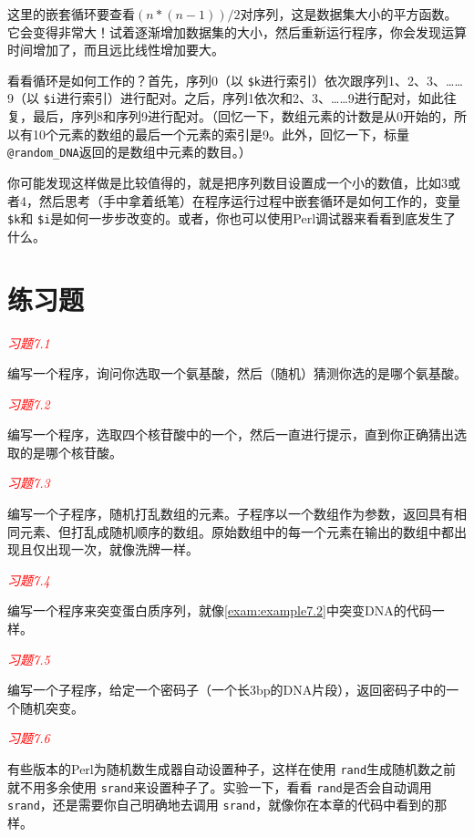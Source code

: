 这里的嵌套循环要查看$(n * (n-1)) / 2$对序列，这是数据集大小的平方函数。它会变得非常大！试着逐渐增加数据集的大小，然后重新运行程序，你会发现运算时间增加了，而且远比线性增加要大。

看看循环是如何工作的？首先，序列0（以 \verb|$k|进行索引）依次跟序列1、2、3、……9（以 \verb|$i|进行索引）进行配对。之后，序列1依次和2、3、……9进行配对，如此往复，最后，序列8和序列9进行配对。（回忆一下，数组元素的计数是从0开始的，所以有10个元素的数组的最后一个元素的索引是9。此外，回忆一下，标量 \verb|@random_DNA|返回的是数组中元素的数目。）

你可能发现这样做是比较值得的，就是把序列数目设置成一个小的数值，比如3或者4，然后思考（手中拿着纸笔）在程序运行过程中嵌套循环是如何工作的，变量 \verb|$k|和 \verb|$i|是如何一步步改变的。或者，你也可以使用Perl调试器来看看到底发生了什么。

\section{练习题}
\textcolor{red}{\textit{习题7.1}}
\begin{adjustwidth}{4em}{}
编写一个程序，询问你选取一个氨基酸，然后（随机）猜测你选的是哪个氨基酸。
\end{adjustwidth}

\textcolor{red}{\textit{习题7.2}}
\begin{adjustwidth}{4em}{}
编写一个程序，选取四个核苷酸中的一个，然后一直进行提示，直到你正确猜出选取的是哪个核苷酸。
\end{adjustwidth}

\textcolor{red}{\textit{习题7.3}}
\begin{adjustwidth}{4em}{}
编写一个子程序，随机打乱数组的元素。子程序以一个数组作为参数，返回具有相同元素、但打乱成随机顺序的数组。原始数组中的每一个元素在输出的数组中都出现且仅出现一次，就像洗牌一样。
\end{adjustwidth}

\textcolor{red}{\textit{习题7.4}}
\begin{adjustwidth}{4em}{}
编写一个程序来突变蛋白质序列，就像\autoref{exam:example7.2}中突变DNA的代码一样。
\end{adjustwidth}

\textcolor{red}{\textit{习题7.5}}
\begin{adjustwidth}{4em}{}
编写一个子程序，给定一个密码子（一个长3bp的DNA片段），返回密码子中的一个随机突变。
\end{adjustwidth}

\textcolor{red}{\textit{习题7.6}}
\begin{adjustwidth}{4em}{}
有些版本的Perl为随机数生成器自动设置种子，这样在使用 \verb|rand|生成随机数之前就不用多余使用 \verb|srand|来设置种子了。实验一下，看看 \verb|rand|是否会自动调用 \verb|srand|，还是需要你自己明确地去调用 \verb|srand|，就像你在本章的代码中看到的那样。
\end{adjustwidth}

